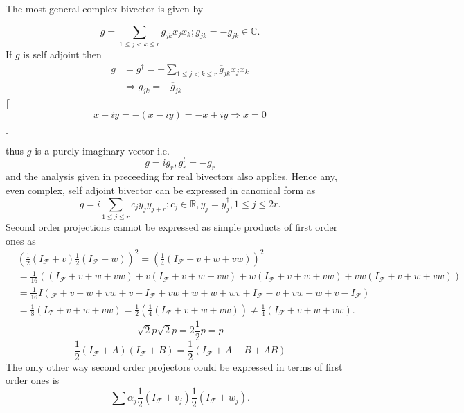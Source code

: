 \documentclass[aps,preprint]{revtex4}%
\begin{document}
The most general complex bivector is given by%

\begin{equation}
g=\sum_{1\leq j<k\leq r}g_{jk}x_{j}x_{k};g_{jk}=-g_{jk}\in\mathbb{C}.
\end{equation}
If $g$ is self adjoint then
\begin{align}
g  &  =g^{\dagger}=-\sum_{1\leq j<k\leq r}\overline{g}_{jk}x_{j}x_{k}\\
&  \Rightarrow g_{jk}=-\overline{g}_{jk}%
\end{align}
$\lceil$%
\begin{equation}
x+iy=-\left(  x-iy\right)  =-x+iy\Rightarrow x=0
\end{equation}
$\rfloor$

thus $g$ is a purely imaginary vector i.e.
\begin{equation}
g=ig_{r},g_{r}^{t}=-g_{r}%
\end{equation}
and the analysis given in preceeding for real bivectors also applies. Hence
any, even complex, self adjoint bivector can be expressed in canonical form
as
\begin{equation}
g=i\sum_{1\leq j\leq r}c_{j}y_{j}y_{j+r};c_{j}\in\mathbb{R},y_{j}%
=y_{j}^{\dagger},1\leq j\leq2r.
\end{equation}
Second order projections cannot be expressed as simple products of first order
ones as
\begin{align}
&  \left(  \frac{1}{2}\left(  I_{\mathcal{F}}+v\right)  \frac{1}{2}\left(
I_{\mathcal{F}}+w\right)  \right)  ^{2}=\left(  \frac{1}{4}\left(
I_{\mathcal{F}}+v+w+vw\right)  \right)  ^{2}\\
&  =\frac{1}{16}\left(  \left(  I_{\mathcal{F}}+v+w+vw\right)  +v\left(
I_{\mathcal{F}}+v+w+vw\right)  +w\left(  I_{\mathcal{F}}+v+w+vw\right)
+vw\left(  I_{\mathcal{F}}+v+w+vw\right)  \right)  \\
&  =\frac{1}{16}I\left(  _{\mathcal{F}}+v+w+vw+v+I_{\mathcal{F}}%
+vw+w+w+wv+I_{\mathcal{F}}-v+vw-w+v-I_{\mathcal{F}}\right)  \\
&  =\frac{1}{8}\left(  I_{\mathcal{F}}+v+w+vw\right)  =\frac{1}{2}\left(
\frac{1}{4}\left(  I_{\mathcal{F}}+v+w+vw\right)  \right)  \neq\frac{1}%
{4}\left(  I_{\mathcal{F}}+v+w+vw\right)  .
\end{align}%
\begin{equation}
\sqrt{2}p\sqrt{2}p=2\frac{1}{2}p=p
\end{equation}%
\begin{equation}
\frac{1}{2}\left(  I_{\mathcal{F}}+A\right)  \left(  I_{\mathcal{F}}+B\right)
=\frac{1}{2}\left(  I_{\mathcal{F}}+A+B+AB\right)
\end{equation}
The only other way second order projectors could be expressed in terms of
first order ones is
\begin{equation}
\sum\alpha_{j}\frac{1}{2}\left(  I_{\mathcal{F}}+v_{j}\right)  \frac{1}%
{2}\left(  I_{\mathcal{F}}+w_{j}\right)  .
\end{equation}
\end{document}
